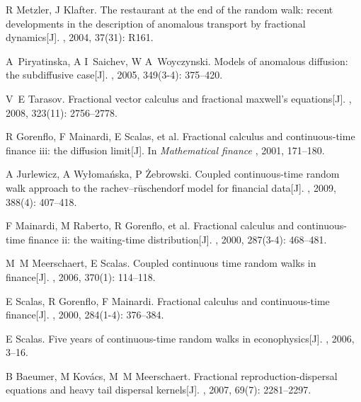 \documentclass[twoside,UTF8]{nputhesis}
\begin{document}
\begin{thebibliography}{99}
	R Metzler, J Klafter.
	\newblock The restaurant at the end of the random walk: recent developments in
	the description of anomalous transport by fractional dynamics[J].
	, 2004, 37(31): R161.
	
	A~Piryatinska, A I~Saichev, W A~Woyczynski.
	\newblock Models of anomalous diffusion: the subdiffusive case[J].
	, 2005, 349(3-4): 375--420.
	
	V~E Tarasov.
	\newblock Fractional vector calculus and fractional maxwell's equations[J].
	, 2008, 323(11): 2756--2778.
	
	R Gorenflo, F Mainardi, E Scalas, et al.
	\newblock Fractional calculus and continuous-time finance iii: the diffusion
	limit[J].
	\newblock In {\em Mathematical finance} , 2001, 171--180.
	
	A Jurlewicz, A Wy{\l}oma{\'n}ska, P {\.Z}ebrowski.
	\newblock Coupled continuous-time random walk approach to the
	rachev--r{\"u}schendorf model for financial data[J].
	, 2009, 388(4): 407--418.
	
	F Mainardi, M Raberto, R Gorenflo, et al.
	\newblock Fractional calculus and continuous-time finance ii: the waiting-time
	distribution[J].
	, 2000, 287(3-4): 468--481.
	
	M~M Meerschaert, E Scalas.
	\newblock Coupled continuous time random walks in finance[J].
	, 2006, 370(1): 114--118.
	
	E Scalas, R Gorenflo, F Mainardi.
	\newblock Fractional calculus and continuous-time finance[J].
	, 2000, 284(1-4): 376--384.
	
	E Scalas.
	\newblock Five years of continuous-time random walks in econophysics[J].
	, 2006, 3--16.
	
	B Baeumer, M Kov{\'a}cs, M~M Meerschaert.
	\newblock Fractional reproduction-dispersal equations and heavy tail dispersal
	kernels[J].
	, 2007, 69(7): 2281--2297.
	

\end{thebibliography}
\end{document}
